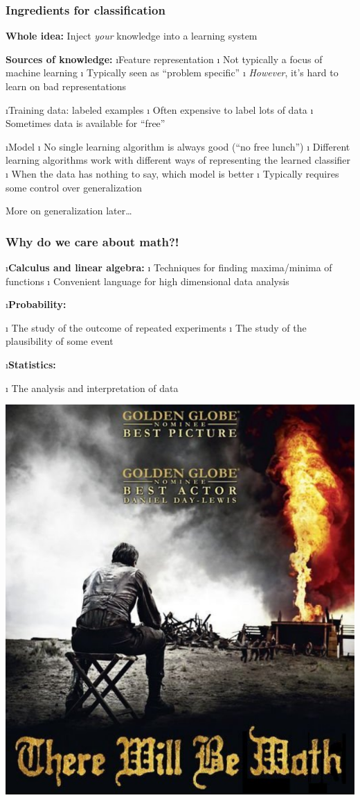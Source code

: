 \documentclass{beamer}
\newcommand{\vsp}{\vspace{1em}}
\newcommand{\blue}[1]{{\color{blue}#1}}
\newcommand{\red}[1]{{\color{red}#1}}
\begin{document}
\begin{frame}
\frametitle{Ingredients for classification}

{\bf Whole idea:} \blue{Inject \emph{your} knowledge into a learning system}

\vsp
{\bf Sources of knowledge:}
\bee
\i Feature representation
\bei
\i<2-> Not typically a focus of machine learning
\i<2-> Typically seen as ``problem specific''
\i<2-> \emph{However}, it's hard to learn on bad representations
\eni

\i Training data: labeled examples
\bei
\i<3-> Often expensive to label lots of data
\i<3-> Sometimes data is available for ``free''
\eni

\i Model
\bei
\i<4-> No single learning algorithm is always good (\blue{``no free lunch''})
\i<4-> Different learning algorithms work with different ways of
representing the learned classifier
\i<4-> When the data has nothing to say, which model is better
\i<4-> Typically requires some control over \red{generalization}
\eni
\ene
\end{frame}




\begin{frame}
\begin{center}
\blue{\huge More on generalization later\dots}
\end{center}
\end{frame}


\begin{frame}
\frametitle{Why do we care about math?!}

\parbox{.5\textwidth}{
\bei
\i \blue{\bf Calculus and linear algebra:}
\bee
\i<2-> Techniques for finding maxima/minima of functions
\i<3-> Convenient language for high dimensional data analysis
\ene

\i \blue{\bf Probability:}

\bee
\i<4-> The study of the outcome of repeated experiments
\i<5-> The study of the plausibility of some event
\ene

\i \blue{\bf Statistics:}

\bee
\i<6-> The analysis and interpretation of data
\ene
\eni
}%
\parbox{.5\textwidth}{
\includegraphics[width=.5\textwidth]{therewillbemath.png}
}

\end{frame}
\end{document}
